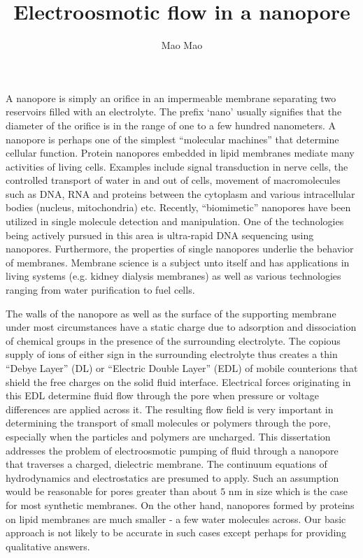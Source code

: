 \documentclass[12pt]{nuthesis}	%
\author{Mao Mao}
\title{Electroosmotic flow in a nanopore}
\begin{document}
%	
%


\frontmatter		%

\maketitle		%

\copyrightpage		%

\abstract		%
A nanopore is simply an orifice in an impermeable membrane separating two reservoirs filled with an electrolyte. The prefix `nano' usually signifies that the diameter of the orifice is in the range of one to a few hundred nanometers. A nanopore is perhaps one of the simplest ``molecular machines'' that determine cellular function. Protein nanopores embedded in lipid membranes mediate many activities of living cells. Examples include signal transduction in nerve cells, the controlled transport of water in and out of cells, movement of macromolecules such as DNA, RNA and proteins between the cytoplasm and various intracellular bodies (nucleus, mitochondria) etc. Recently, ``biomimetic'' nanopores have been utilized in single molecule detection and manipulation. One of the technologies being actively pursued in this area is ultra-rapid DNA sequencing using nanopores. Furthermore, the properties of single nanopores underlie the behavior of membranes. Membrane science is a subject unto itself and has applications in living systems (e.g. kidney dialysis membranes) as well as various technologies ranging from water purification to fuel cells. 

 
The walls of the nanopore as well as the surface of the supporting membrane under most circumstances have a static charge due to adsorption and dissociation of chemical groups in the presence of the surrounding electrolyte. The copious supply of ions of either sign in the surrounding electrolyte thus creates a thin ``Debye Layer'' (DL) or ``Electric Double Layer'' (EDL) of mobile counterions that shield the free charges on the solid fluid interface. Electrical forces originating in this EDL determine fluid flow through the pore when pressure or voltage differences are applied across it. The resulting flow field is very important in determining the transport of small molecules or polymers through the pore, especially when the particles and polymers are uncharged. This dissertation addresses the problem of electroosmotic pumping of fluid through a nanopore that traverses a charged, dielectric membrane. The continuum equations of hydrodynamics and electrostatics are presumed to apply. Such an assumption would be reasonable for pores greater than about $5$ nm in size which is the case for most synthetic membranes. On the other hand, nanopores formed by proteins on lipid membranes are much smaller - a few water molecules across. Our basic approach is not likely to be accurate in such cases except perhaps for providing qualitative answers.
\end{document}
